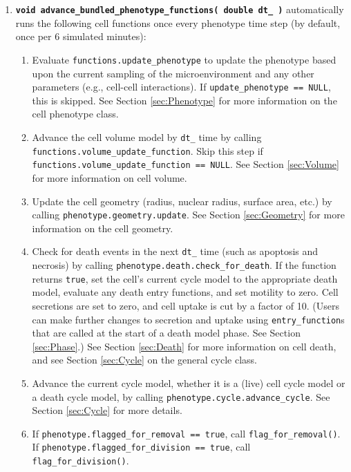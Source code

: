 \documentclass[12pt]{article}
\renewcommand{\v}{\verb}
\newcommand{\smallcode}[1]{\textbf{\texttt{#1}}}
\begin{document}
\begin{enumerate}
\item 
\smallcode{void advance\_bundled\_phenotype\_functions( double dt\_ )} 
automatically runs the following cell functions once every 
phenotype time step (by default, once per 6 simulated minutes): 

\begin{enumerate}
\item 
Evaluate 
\v|functions.update_phenotype| to update the phenotype based upon 
the current sampling of the microenvironment and any other parameters 
(e.g., cell-cell interactions). If \hfill\break
\v|update_phenotype == NULL|, this is skipped. See 
Section \ref{sec:Phenotype} for more information on the cell 
phenotype class. 

\item 
Advance the cell volume model by \v|dt_| time by calling 
\v|functions.volume_update_function|. Skip this step if 
\v|functions.volume_update_function == NULL|. See Section 
\ref{sec:Volume} for more information on cell volume. 

\item 
Update the cell geometry (radius, nuclear radius, surface area, etc.) 
by calling \hfill\break
\v|phenotype.geometry.update|. See Section \ref{sec:Geometry} for 
more information on the cell geometry. 

\item 
Check for death events in the next \v|dt_| time (such as apoptosis 
and necrosis) by calling \hfill\break
\v|phenotype.death.check_for_death|. If the function returns 
\v|true|, set the cell's current cycle model to the appropriate 
death model, evaluate any death entry functions, and 
set motility to zero. Cell secretions are set to zero, 
and cell uptake is cut by a factor of 10. 
(Users can make further changes to secretion and uptake 
using \v|entry_function|s that are called at the start 
of a death model phase. See Section \ref{sec:Phase}.) 
See Section \ref{sec:Death} for more information on cell death, 
and see Section \ref{sec:Cycle} on the general cycle class. 

\item 
Advance the current cycle model, whether it is a (live) cell cycle 
model or a death cycle model, by calling 
\v|phenotype.cycle.advance_cycle|. See Section \ref{sec:Cycle} for 
more details. 

\item 
If \v|phenotype.flagged_for_removal == true|, call 
\v|flag_for_removal()|. \hfill\break If 
\v|phenotype.flagged_for_division == true|, call 
\v|flag_for_division()|. 
\end{enumerate}


\end{enumerate}
\end{document}
